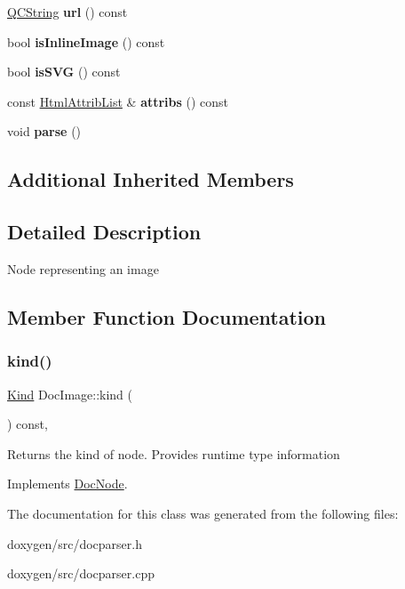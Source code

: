 \begin{DoxyCompactItemize}
\mbox{\hyperlink{class_q_c_string}{Q\+C\+String}} {\bfseries url} () const
\item 
\mbox{\label{class_doc_image_ae52199cbb5da4e10ccb3a9b53c4978ac}} 
bool {\bfseries is\+Inline\+Image} () const
\item 
\mbox{\label{class_doc_image_ae604f9461d7685908488ead7a6d72ca0}} 
bool {\bfseries is\+S\+VG} () const
\item 
\mbox{\label{class_doc_image_a01ac4792c4a17232af299b7c473ff1e8}} 
const \mbox{\hyperlink{class_html_attrib_list}{Html\+Attrib\+List}} \& {\bfseries attribs} () const
\item 
\mbox{\label{class_doc_image_acbcccdba0822fb5c0776ca318cbfd631}} 
void {\bfseries parse} ()
\end{DoxyCompactItemize}
\subsection*{Additional Inherited Members}


\subsection{Detailed Description}
Node representing an image 

\subsection{Member Function Documentation}
\mbox{\label{class_doc_image_ad4716e09dfb45878f06d20e07d1ccf32}} 
\subsubsection{\texorpdfstring{kind()}{kind()}}
{\footnotesize\ttfamily \mbox{\hyperlink{class_doc_node_aebd16e89ca590d84cbd40543ea5faadb}{Kind}} Doc\+Image\+::kind (\begin{DoxyParamCaption}{ }\end{DoxyParamCaption}) const\hspace{0.3cm}{\ttfamily [inline]}, {\ttfamily [virtual]}}

Returns the kind of node. Provides runtime type information 

Implements \mbox{\hyperlink{class_doc_node_a108ffd214a72ba6e93dac084a8f58049}{Doc\+Node}}.



The documentation for this class was generated from the following files\+:\begin{DoxyCompactItemize}
\item 
doxygen/src/docparser.\+h\item 
doxygen/src/docparser.\+cpp\end{DoxyCompactItemize}
